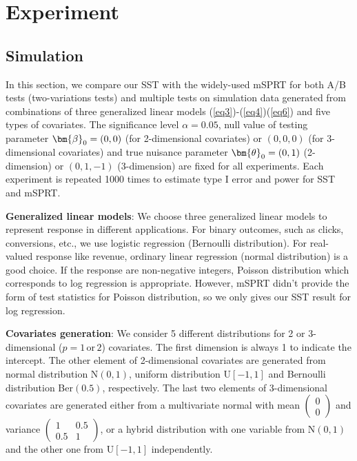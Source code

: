 \documentclass[letterpaper]{article} %
\newcommand{\V}[1]{{\bm{\mathbf{\MakeLowercase{#1}}}}} %
\begin{document}
\section{Experiment}
\subsection{Simulation}
In this section, we compare our SST with the widely-used mSPRT for both A/B tests (two-variations tests) and multiple tests on simulation data generated from combinations of three generalized linear models (\ref{eq3})-(\ref{eq4})(\ref{eq6}) and five types of covariates. The significance level $\alpha=0.05$, null value of testing parameter $\V{\beta}_0=(0,0)$ (for 2-dimensional covariates) or $(0,0,0)$ (for 3-dimensional covariates) and true nuisance parameter $\V{\theta}_0=(0,1)$ (2-dimension) or $(0,1,-1)$ (3-dimension) are fixed for all experiments. Each experiment is repeated 1000 times to estimate type I error and power for SST and mSPRT.

\textbf{Generalized linear models}: We choose three generalized linear models to represent response in different applications. For binary outcomes, such as clicks, conversions, etc., we use logistic regression (Bernoulli distribution). For real-valued response like revenue, ordinary linear regression (normal distribution) is a good choice. If the response are non-negative integers, Poisson distribution which corresponds to log regression is appropriate. However, mSPRT didn't provide the form of test statistics for Poisson distribution, so we only gives our SST result for log regression.

\textbf{Covariates generation}: We consider 5 different distributions for 2 or 3-dimensional ($p=1 \,\text{or}\, 2$) covariates. The first dimension is always 1 to indicate the intercept. The other element of 2-dimensional covariates are generated from normal distribution N$(0,1)$, uniform distribution U$[-1,1]$ and Bernoulli distribution Ber$(0.5)$, respectively. The last two elements of 3-dimensional covariates are generated either from a multivariate normal with mean $(\begin{smallmatrix}
0\\0
\end{smallmatrix})$ and variance $(\begin{smallmatrix}
1 & 0.5\\0.5 & 1
\end{smallmatrix})$, or a hybrid distribution with one variable from N$(0,1)$ and the other one from U$[-1,1]$ independently.
\end{document}
